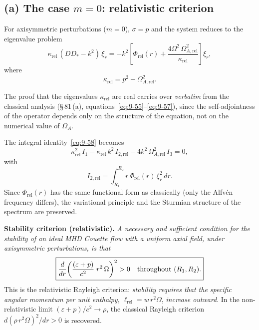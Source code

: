 \subsection*{(a) The case $m=0$: relativistic criterion}
\label{sec:rel-81a}

For axisymmetric perturbations ($m=0$), $\sigma = p$ and the system
reduces to the eigenvalue problem
\begin{equation}
  \kappa_{\mathrm{rel}}\,(DD_{*} - k^{2})\,\xi_{r}
  = -k^{2}\!\left[\Phi_{\mathrm{rel}}(r)
    + \frac{4\Omega^{2}\,\Omega_{A,\mathrm{rel}}^{2}}
           {\kappa_{\mathrm{rel}}}\right]\xi_{r},
  \label{eq:rel-9-53}
\end{equation}
where
\begin{equation}
  \kappa_{\mathrm{rel}} = p^{2} - \Omega_{A,\mathrm{rel}}^{2}.
  \label{eq:rel-9-54}
\end{equation}

The proof that the eigenvalues $\kappa_{\mathrm{rel}}$ are real
carries over \emph{verbatim} from the classical analysis
(\S\,81\,(a), equations~\eqref{eq:9-55}--\eqref{eq:9-57}), since the
self-adjointness of the operator depends only on the structure of the
equation, not on the numerical value of $\Omega_{A}$.

The integral identity~\eqref{eq:9-58} becomes
\begin{equation}
  \kappa_{\mathrm{rel}}^{2}\,I_{1}
  - \kappa_{\mathrm{rel}}\,k^{2}\,I_{2,\mathrm{rel}}
  - 4k^{2}\,\Omega_{A,\mathrm{rel}}^{2}\,I_{3} = 0,
  \label{eq:rel-9-58}
\end{equation}
with
\begin{equation}
  I_{2,\mathrm{rel}}
  = \int_{R_{1}}^{R_{2}} r\,\Phi_{\mathrm{rel}}(r)\,\xi_{r}^{2}\,dr.
  \label{eq:rel-9-I2}
\end{equation}
Since $\Phi_{\mathrm{rel}}(r)$ has the same functional form as
classically (only the Alfv\'en frequency differs), the variational
principle and the Sturmian structure of the spectrum are preserved.

\medskip\noindent\textbf{Stability criterion (relativistic).}
\emph{A necessary and sufficient condition for the stability of an
ideal MHD Couette flow with a uniform axial field, under axisymmetric
perturbations, is that}
\begin{equation}
  \boxed{%
  \frac{d}{dr}\!\left(\frac{(\varepsilon+p)}{c^{2}}\;
    r^{2}\,\Omega\right)^{2} > 0
  \quad\text{throughout } (R_{1},R_{2}).}
  \label{eq:rel-9-stability}
\end{equation}
This is the relativistic Rayleigh criterion: \emph{stability requires
that the specific angular momentum per unit enthalpy,}
$\ell_{\mathrm{rel}} = w\,r^{2}\Omega$, \emph{increase outward}.
In the non-relativistic limit $(\varepsilon+p)/c^{2}\to\rho$, the
classical Rayleigh criterion $d(\rho\,r^{2}\Omega)^{2}/dr > 0$ is
recovered.

